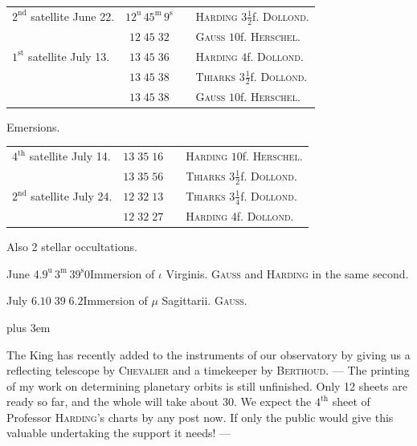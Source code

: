 \begin{center}
\fontsize{10}{12}\selectfont\setlength{\tabcolsep}{3pt}\begin{tabular}{lccl}
$2^{\text{nd}}$ satellite June 22. & $12^{\text{u}}\,45^{\text{m}}\,9^{\text{s}}$ & & \textsc{Harding} $3\tfrac12$f. \textsc{Dollond}.\\
& $12\;45\;32$ & & \textsc{Gauss} $10$f. \textsc{Herschel}.\\
$1^{\text{st}}$ satellite July 13. & $13\;45\;36$ & & \textsc{Harding} $4$f. \textsc{Dollond}.\\
& $13\;45\;38$ & & \textsc{Thiarks} $3\tfrac12$f. \textsc{Dollond}.\\
& $13\;45\;38$ & & \textsc{Gauss} $10$f. \textsc{Herschel}.\\
\end{tabular}

Emersions.

\fontsize{10}{12}\selectfont\setlength{\tabcolsep}{3pt}\begin{tabular}{lccl}
$4^{\text{th}}$ satellite July 14. & $13\;35\;16$ & & \textsc{Harding} $10$f. \textsc{Herschel}.\\
& $13\;35\;56$ & & \textsc{Thiarks} $3\tfrac12$f. \textsc{Dollond}.\\
$2^{\text{nd}}$ satellite July 24. & $12\;32\;13$ & & \textsc{Thiarks} $3\tfrac14$f. \textsc{Dollond}.\\
& $12\;32\;27$ & & \textsc{Harding} $4$f. \textsc{Dollond}.\\
\end{tabular}
\end{center}

\par\indent Also 2 stellar occultations.

\smallskip
\noindent June 4.\quad $9^{\text{u}}\,3^{\text{m}}\,39^{\text{s}}0$\quad Immersion of $\iota$ Virginis. \textsc{Gauss} and \textsc{Harding} in the same second.

\smallskip
\noindent July 6.\quad $10\;39\;6.2$\quad Immersion of $\mu$ Sagittarii. \textsc{Gauss}.

\smallskip
{\rightskip=0pt plus 3em\par\indent The King has recently added to the instruments of our observatory by giving us a reflecting telescope by \textsc{Chevalier} and a timekeeper by \textsc{Berthoud}. --- The printing of my
work on determining planetary orbits is still unfinished. Only 12 sheets are ready so far, and the whole will take about 30. We expect the $4^{\text{th}}$ sheet of Professor \textsc{Harding}’s charts by any post now. If only the public would give this valuable undertaking the support it needs! ---\par}
